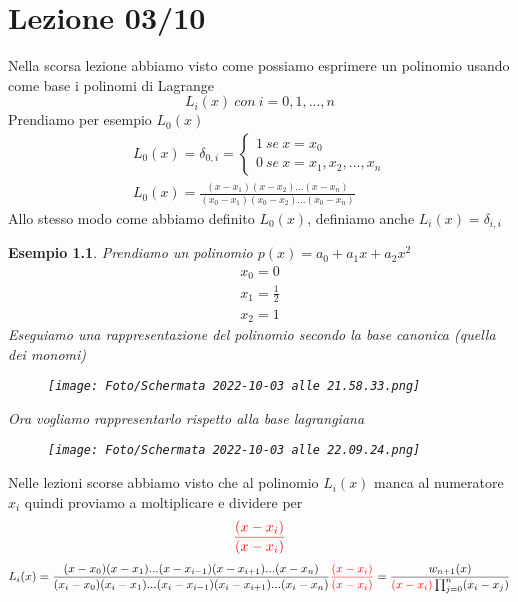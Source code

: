 \documentclass[a4paper, portrait]{book}
\numberwithin{equation}{chapter} %
\newtheorem{example}{Esempio}
\begin{document}
\chapter{Lezione 03/10}
Nella scorsa lezione abbiamo visto come possiamo esprimere un polinomio usando come base i polinomi di Lagrange
\begin{equation}
    L_i (x) \ con \ i = 0,1,...,n
\end{equation}
Prendiamo per esempio $L_0(x)$
\begin{gather}
    L_0(x) = \delta_{0,i} = \begin{cases}
        1 \ se \ x = x_0\\
        0 \ se \ x = x_1,x_2,...,x_n
    \end{cases}\\
    L_0(x) = \frac{(x-x_1)(x-x_2)...(x-x_n)}{(x_0-x_1)(x_0-x_2)...(x_0-x_n)}
\end{gather}
Allo stesso modo come abbiamo definito $L_0(x)$, definiamo anche $L_i(x) = \delta_{i,i}$\\
\begin{example}
    Prendiamo un polinomio $p(x) = a_0 + a_1 x + a_2 x^2$
    \begin{gather*}
        x_0 = 0\\
        x_1 = \frac{1}{2}\\
        x_2 = 1
    \end{gather*}
    Eseguiamo una rappresentazione del polinomio secondo la base canonica (quella dei monomi)
    \begin{figure}[h!]
        \centering
        \texttt{[image: Foto/Schermata 2022-10-03 alle 21.58.33.png]}
        \caption{}
    \end{figure}
    Ora vogliamo rappresentarlo rispetto alla base lagrangiana
    \begin{figure}[h!]
        \centering
        \texttt{[image: Foto/Schermata 2022-10-03 alle 22.09.24.png]}
        \caption{}
    \end{figure}
\end{example}
Nelle lezioni scorse abbiamo visto che al polinomio $L_i(x)$ manca al numeratore $x_i$ quindi proviamo a moltiplicare e dividere per $$\color{red}{\frac{(x-x_i)}{(x-x_i)}}$$
\begin{equation}
    L_i(x) = \frac{(x-x_0)(x-x_1)...(x-x_{i-1})(x-x_{i+1})...(x-x_n)}{(x_i-x_0)(x_i-x_1)...(x_i -x_{i-1})(x_i - x_{i+1})...(x_i-x_n)}{\color{red}{\frac{(x-x_i)}{(x-x_i)}}} = \frac{w_{n+1}(x)}{{\color{red}{(x-x_i)}}\prod_{j=0}^{n}(x_i-x_j)}
\end{equation}
\end{document}
